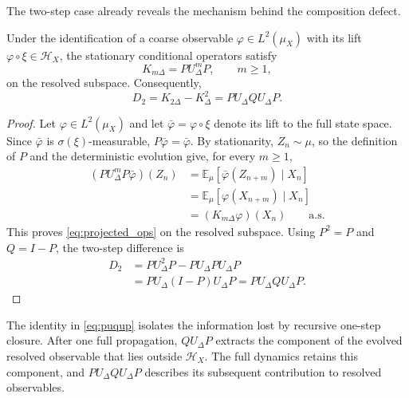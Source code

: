 \documentclass[final,hidelinks]{siamart251216}
\newcommand{\E}{\mathbb{E}}
\begin{document}
The two-step case already reveals the mechanism behind the composition
defect.

\begin{proposition}
\label{thm:puqup}
Under the identification of a coarse observable
$\varphi\in L^2(\mu_X)$ with its lift
$\varphi\circ\xi\in\mathcal H_X$, the stationary conditional operators
satisfy
\begin{equation}
    K_{m\Delta}=P U_\Delta^mP,
    \qquad
    m\ge1,
    \label{eq:projected_ops}
\end{equation}
on the resolved subspace. Consequently,
\begin{equation}
\boxed{
    D_2
    =K_{2\Delta}-K_\Delta^2
    =P U_\Delta Q U_\Delta P.
}
    \label{eq:puqup}
\end{equation}
\end{proposition}

\begin{proof}
Let $\varphi\in L^2(\mu_X)$ and let
$\bar\varphi=\varphi\circ\xi$ denote its lift to the full state space.
Since $\bar\varphi$ is $\sigma(\xi)$-measurable,
$P\bar\varphi=\bar\varphi$. By stationarity, $Z_n\sim\mu$, so the
definition of $P$ and the deterministic evolution give, for every $m\ge1$,
\begin{align*}
    (P U_\Delta^mP\bar\varphi)(Z_n)
    &=
    \E_\mu[
        \bar\varphi(Z_{n+m})
        \mid X_n
    ]\\
    &=
    \E_\mu[
        \varphi(X_{n+m})
        \mid X_n
    ]\\
    &=
    (K_{m\Delta}\varphi)(X_n)
    \qquad\text{a.s.}
\end{align*}
This proves \eqref{eq:projected_ops} on the resolved subspace.
Using $P^2=P$ and $Q=I-P$, the two-step difference is
\begin{align*}
    D_2
    &=
    P U_\Delta^2P-P U_\Delta P U_\Delta P\\
    &=
    P U_\Delta(I-P)U_\Delta P
    =
    P U_\Delta Q U_\Delta P.
\end{align*}
\end{proof}

The identity in \eqref{eq:puqup} isolates the information lost by recursive
one-step closure. After one full propagation, $Q U_\Delta P$ extracts the
component of the evolved resolved observable that lies outside
$\mathcal H_X$. The full dynamics retains this component, and
$P U_\Delta Q U_\Delta P$ describes its subsequent contribution to
resolved observables.
\end{document}
